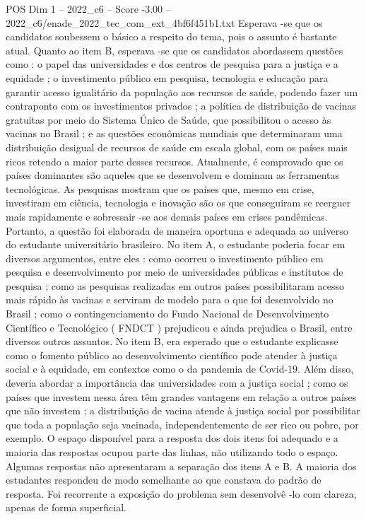 \begin{textsample}{POS Dim 1 – 2022\_c6 – Score -3.00 – 2022\_c6/enade\_2022\_tec\_com\_ext\_4bf6f451b1.txt}
Esperava -se que os candidatos soubessem o básico a respeito do tema, pois o assunto é bastante atual.
Quanto ao item B, esperava -se que os candidatos abordassem questões como : o papel das universidades e dos centros de pesquisa para a justiça e a equidade ; o investimento público em pesquisa, tecnologia e educação para garantir acesso igualitário da população aos recursos de saúde, podendo fazer um contraponto com os investimentos privados ; a política de distribuição de vacinas gratuitas por meio do Sistema Único de Saúde, que possibilitou o acesso às vacinas no Brasil ; e as questões econômicas mundiais que determinaram uma distribuição desigual de recursos de saúde em escala global, com os países mais ricos retendo a maior parte desses recursos.
Atualmente, é comprovado que os países dominantes são aqueles que se desenvolvem e dominam as ferramentas tecnológicas.
As pesquisas mostram que os países que, mesmo em crise, investiram em ciência, tecnologia e inovação são os que conseguiram se reerguer mais rapidamente e sobressair -se aos demais países em crises pandêmicas.
Portanto, a questão foi elaborada de maneira oportuna e adequada ao universo do estudante universitário brasileiro.
No item A, o estudante poderia focar em diversos argumentos, entre eles : como ocorreu o investimento público em pesquisa e desenvolvimento por meio de universidades públicas e institutos de pesquisa ; como as pesquisas realizadas em outros países possibilitaram acesso mais rápido às vacinas e serviram de modelo para o que foi desenvolvido no Brasil ; como o contingenciamento do Fundo Nacional de Desenvolvimento Científico e Tecnológico ( FNDCT ) prejudicou e ainda prejudica o Brasil, entre diversos outros assuntos.
No item B, era esperado que o estudante explicasse como o fomento público ao desenvolvimento científico pode atender à justiça social e à equidade, em contextos como o da pandemia de Covid-19.
Além disso, deveria abordar a importância das universidades com a justiça social ; como os países que investem nessa área têm grandes vantagens em relação a outros países que não investem ; a distribuição de vacina atende à justiça social por possibilitar que toda a população seja vacinada, independentemente de ser rico ou pobre, por exemplo.
O espaço disponível para a resposta dos dois itens foi adequado e a maioria das respostas ocupou parte das linhas, não utilizando todo o espaço.
Algumas respostas não apresentaram a separação dos itens A e B.
A maioria dos estudantes respondeu de modo semelhante ao que constava do padrão de resposta.
Foi recorrente a exposição do problema sem desenvolvê -lo com clareza, apenas de forma superficial.

\end{textsample}
